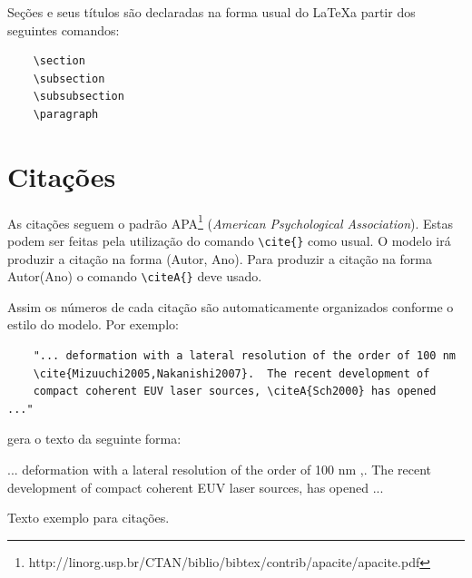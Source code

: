 \documentclass[12pt,A4,A4pt]{article}
\begin{document}
\hspace{0.5cm}Seções e seus títulos são declaradas na forma usual do \LaTeX a partir dos seguintes comandos:

\begin{verbatim}
    \section
    \subsection
    \subsubsection
    \paragraph
\end{verbatim}

\section{Citações}
\hspace{0.5cm}As citações seguem o padrão APA\footnote{http://linorg.usp.br/CTAN/biblio/bibtex/contrib/apacite/apacite.pdf} (\textit{American Psychological Association}). Estas podem ser feitas pela utilização do comando \verb|\cite{}| como usual. O modelo irá produzir a citação na forma (Autor, Ano). Para produzir a citação na forma Autor(Ano) o comando  \verb|\citeA{}| deve usado.

Assim os números de cada citação são automaticamente organizados conforme o estilo do modelo. Por exemplo:

\begin{verbatim}
    "... deformation with a lateral resolution of the order of 100 nm
    \cite{Mizuuchi2005,Nakanishi2007}.  The recent development of 
    compact coherent EUV laser sources, \citeA{Sch2000} has opened ..."
\end{verbatim}
gera o texto da seguinte forma:

... deformation with a lateral resolution of the order of 100 nm \cite{Nakanishi2007},\break \cite{Mizuuchi2002}. The recent development of compact coherent EUV laser sources,  has opened ...

Texto exemplo para citações.
\end{document}
